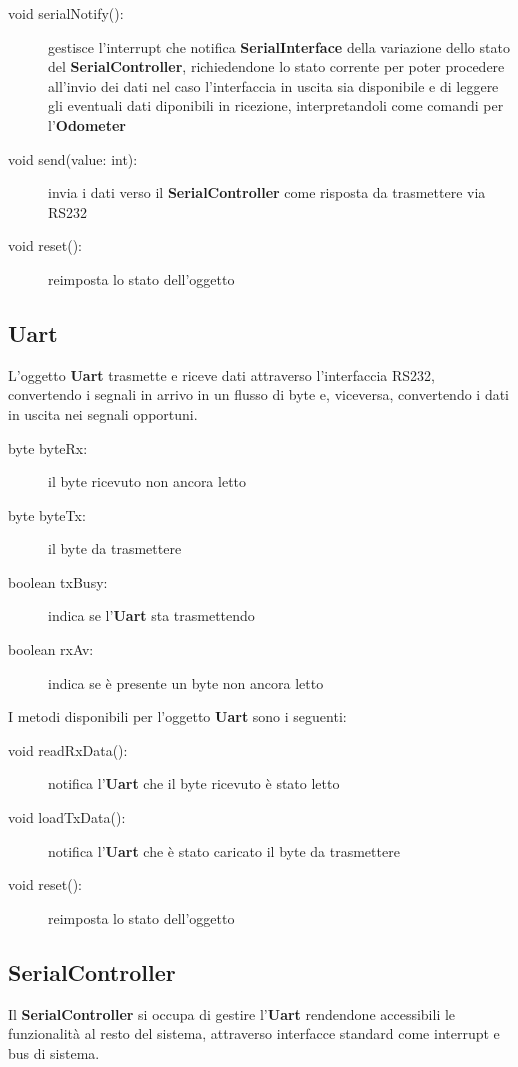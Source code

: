 \documentclass [11pt,a4paper,oneside]{paper}
\newcommand{\component}[1]{\textbf{#1}}
\begin{document}
\begin{description}
\item[void serialNotify():] gestisce l'interrupt che notifica
    \component{SerialInterface} della variazione dello stato del
    \component{SerialController}, richiedendone lo stato corrente
    per poter procedere all'invio dei dati nel caso l'interfaccia
    in uscita sia disponibile e di leggere gli eventuali dati
    diponibili in ricezione, interpretandoli come comandi per
    l'\component{Odometer}
\item[void send(value: int):] invia i dati verso il
    \component{SerialController} come risposta da trasmettere via RS232
\item[void reset():] reimposta lo stato dell'oggetto
\end{description}

\subsection{Uart}
L'oggetto \component{Uart} trasmette e riceve dati attraverso l'interfaccia RS232,
convertendo i segnali in arrivo in un flusso di byte e, viceversa, convertendo
i dati in uscita nei segnali opportuni.

\begin{description}
\item[byte byteRx:] il byte ricevuto non ancora letto
\item[byte byteTx:] il byte da trasmettere
\item[boolean txBusy:] indica se l'\component{Uart} sta trasmettendo
\item[boolean rxAv:] indica se è presente un byte non ancora letto
\end{description}

I metodi disponibili per l'oggetto \component{Uart} sono i seguenti:

\begin{description}
\item[void readRxData():] notifica l'\component{Uart} che il byte ricevuto è
    stato letto
\item[void loadTxData():] notifica l'\component{Uart} che è stato caricato il
    byte da trasmettere
\item[void reset():] reimposta lo stato dell'oggetto
\end{description}

\subsection{SerialController}
Il \component{SerialController} si occupa di gestire l'\component{Uart}
rendendone accessibili le funzionalità al resto del sistema,
attraverso interfacce standard come interrupt e bus di sistema.
\end{document}
